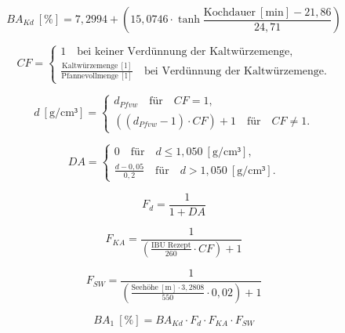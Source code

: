 \documentclass[a4paper,parskip=half]{scrartcl}
\newcommand{\BA}{\mathit{BA}}
\newcommand{\BAKt}{{\mathit{BA}}_{\mathit{Kd}}}
\newcommand{\umin}{\:[\textrm{min}]}
\newcommand{\uden}{\:[\text{g/cm³}]}
\newcommand{\uper}{\:[\text{\%}]}
\newcommand{\uli}{\:[\text{l}]}
\newcommand{\ume}{\:[\text{m}]}
\newcommand{\FKd}{F_{\mathit{d}}}
\newcommand{\FHR}{F_{\mathit{KA}}}
\newcommand{\FSP}{F_{\mathit{SW}}}
\newcommand{\dPfvw}{d_\mathit{Pfvw}}
\begin{document}
\begin{equation}
\BAKt \uper = 7,2994 + \left(15,0746 \cdot \tanh{\frac{\text{Kochdauer} \umin - 21,86}{24,71}}\right)
\label{eq:garetzbakt}
\end{equation}

\begin{equation}
\mathit{CF} = \begin{cases}
1 \quad \text{bei keiner Verdünnung der Kaltwürzemenge}, \\
\frac{\text{Kaltwürzemenge} \uli}{\text{Pfannevollmenge} \uli} \quad \text{bei Verdünnung der Kaltwürzemenge}.
\end{cases}
\label{eq:garetzcf}
\end{equation}

\begin{equation}
d \uden = \begin{cases}
\dPfvw \quad \text{für} \quad \mathit{CF} = 1, \\
\left( \left( \dPfvw - 1 \right) \cdot \mathit{CF} \right) + 1 \quad \text{für} \quad \mathit{CF} \ne 1.
\end{cases}
\label{eq:garetzbg}
\end{equation}

\begin{equation}
\mathit{DA} = \begin{cases}
0 \quad \text{für} \quad d \le 1,050 \uden, \\
\frac{d - 0,05}{0,2} \quad \text{für} \quad d > 1,050 \uden.
\end{cases}
\label{eq:garetzga}
\end{equation}

\begin{equation}
\FKd = \frac{1}{1 + DA}
\label{eq:garetzkd}
\end{equation}

\begin{equation}
\FHR = \frac{1}{\left( \frac{\text{IBU Rezept}}{260} \cdot \mathit{CF} \right) + 1}
\label{eq:garetzhr}
\end{equation}

\begin{equation}
\FSP = \frac{1}{\left(\frac{\text{Seehöhe} \ume \cdot 3,2808}{550} \cdot 0,02 \right) + 1}
\label{eq:garetzsp}
\end{equation}

\begin{equation}
\BA_1 \uper = \BAKt \cdot \FKd \cdot \FHR \cdot \FSP
\label{eq:garetzba1}
\end{equation}
\end{document}
